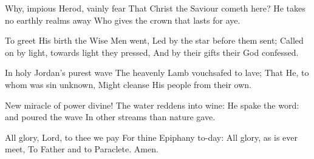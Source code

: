 Why, impious Herod, vainly fear
That Christ the Saviour cometh here?
He takes no earthly realms away
Who gives the crown that lasts for aye.

To greet His birth the Wise Men went,
Led by the star before them sent;
Called on by light, towards light they pressed,
And by their gifts their God confessed.

In holy Jordan's purest wave
The heavenly Lamb vouchsafed to lave;
That He, to whom was sin unknown,
Might cleanse His people from their own.

New miracle of power divine!
The water reddens into wine:
He spake the word: and poured the wave
In other streams than nature gave.

All glory, Lord, to thee we pay
For thine Epiphany to-day:
All glory, as is ever meet,
To Father and to Paraclete.
Amen.